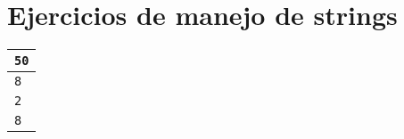 \section{Ejercicios de manejo de strings}
\begin{table}[htbp]
\begin{center}
\begin{tabular}{|l|}
\hline
\texttt{50} \\ \hline
\texttt{8} \\ \hline
\texttt{2} \\ 
\texttt{8} \\ \hline
\end{tabular}
\end{center}
\end{table}
